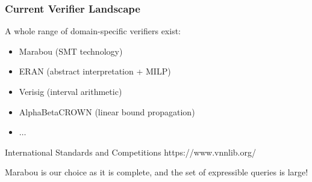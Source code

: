 \documentclass[t,compress,aspectratio=169]{beamer}
\begin{document}
\begin{frame}
\frametitle{Current Verifier Landscape}

A whole range of domain-specific verifiers exist:
\begin{itemize}
\pause
\item Marabou (SMT technology)
\pause
\item ERAN (abstract interpretation + MILP)
\pause
\item Verisig (interval arithmetic)
\item AlphaBetaCROWN (linear bound propagation)
\item $\ldots$
\end{itemize}

\begin{block}{International Standards and Competitions}
https://www.vnnlib.org/
\end{block}

\pause
Marabou is our choice as it is complete, and the set of expressible queries is large!

\end{frame}


\end{document}
